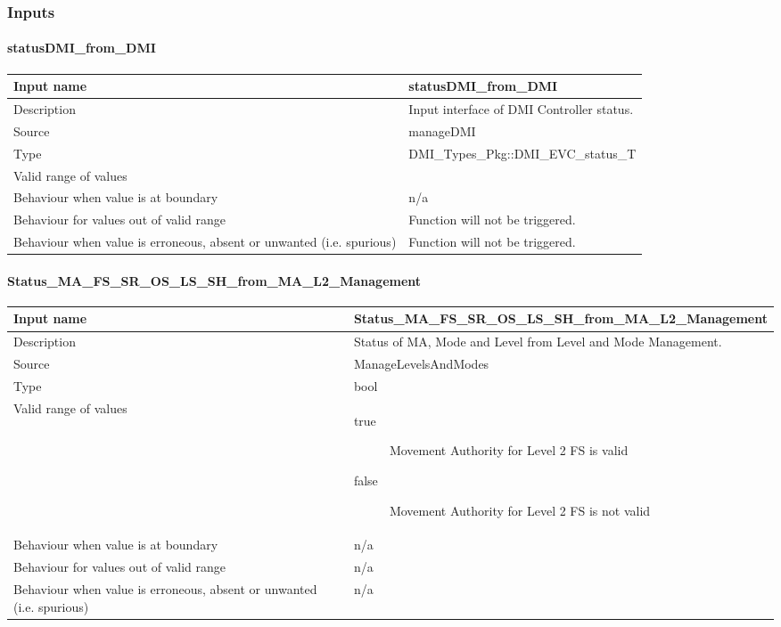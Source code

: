 \subsubsection{Inputs}\label{s:etcs_procedures_inputs}

\paragraph{statusDMI\_from\_DMI}

\begin{longtable}{p{}p{}}
\toprule
Input name				& statusDMI\_from\_DMI \\
\midrule
Description				& Input interface of DMI Controller status. \\
\midrule
Source					& manageDMI  \\ 
\midrule
Type					& DMI\_Types\_Pkg::DMI\_EVC\_status\_T \\
\midrule
Valid range of values	& \todo[inline]{To be completed} \\
\midrule
Behaviour when value is at boundary	& n/a \\
\midrule
Behaviour for values out of valid range	& Function will not be triggered. \\
\midrule
Behaviour when value is erroneous, absent or unwanted (i.e. spurious) & Function will not be triggered. \\
\bottomrule
\end{longtable}


\paragraph{Status\_MA\_FS\_SR\_OS\_LS\_SH\_from\_MA\_L2\_Management}

\begin{longtable}{p{}p{}}
\toprule
Input name				& Status\_MA\_FS\_SR\_OS\_LS\_SH\_from\_MA\_L2\_Management \\
\midrule
Description				& Status of MA, Mode and Level from Level and Mode Management. \\
\midrule
Source					& ManageLevelsAndModes \\ 
\midrule
Type					& bool \\
\midrule
Valid range of values	& \begin{description}
\item[true]Movement Authority for Level 2 FS is valid
\item[false]Movement Authority for Level 2 FS is not valid
\end{description} \\
\midrule
Behaviour when value is at boundary	& n/a \\
\midrule
Behaviour for values out of valid range	& n/a \\
\midrule
Behaviour when value is erroneous, absent or unwanted (i.e. spurious) & n/a \\
\bottomrule
\end{longtable}

